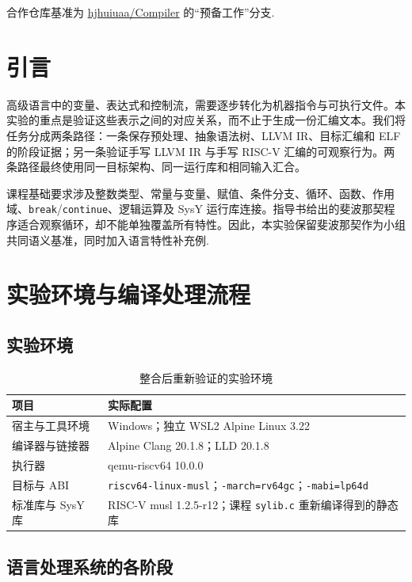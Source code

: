 \documentclass[UTF8,a4paper,10pt]{ctexart}
\begin{document}
合作仓库基准为 \href{https://github.com/hjhuiuaa/Compiler}{hjhuiuaa/Compiler} 的“预备工作”分支.
\section{引言}

高级语言中的变量、表达式和控制流，需要逐步转化为机器指令与可执行文件。本实验的重点是验证这些表示之间的对应关系，而不止于生成一份汇编文本。我们将任务分成两条路径：一条保存预处理、抽象语法树、LLVM IR、目标汇编和 ELF 的阶段证据；另一条验证手写 LLVM IR 与手写 RISC-V 汇编的可观察行为。两条路径最终使用同一目标架构、同一运行库和相同输入汇合。

课程基础要求涉及整数类型、常量与变量、赋值、条件分支、循环、函数、作用域、\texttt{break}/\texttt{continue}、逻辑运算及 SysY 运行库连接。指导书给出的斐波那契程序适合观察循环，却不能单独覆盖所有特性。因此，本实验保留斐波那契作为小组共同语义基准，同时加入语言特性补充例.

\section{实验环境与编译处理流程}

\subsection{实验环境}

\begin{table}[H]
  \centering
  \caption{整合后重新验证的实验环境}\label{tab:env}
  \begin{tabularx}{\textwidth}{p{3.4cm}Y}
    \toprule
    项目 & 实际配置 \\
    \midrule
    宿主与工具环境 & Windows；独立 WSL2 Alpine Linux 3.22 \\
    编译器与链接器 & Alpine Clang 20.1.8；LLD 20.1.8 \\
    执行器 & qemu-riscv64 10.0.0 \\
    目标与 ABI & \texttt{riscv64-linux-musl}；\texttt{-march=rv64gc}；\texttt{-mabi=lp64d} \\
    标准库与 SysY 库 & RISC-V musl 1.2.5-r12；课程 \texttt{sylib.c} 重新编译得到的静态库 \\
    \bottomrule
  \end{tabularx}
\end{table}

\subsection{语言处理系统的各阶段}
\end{document}
